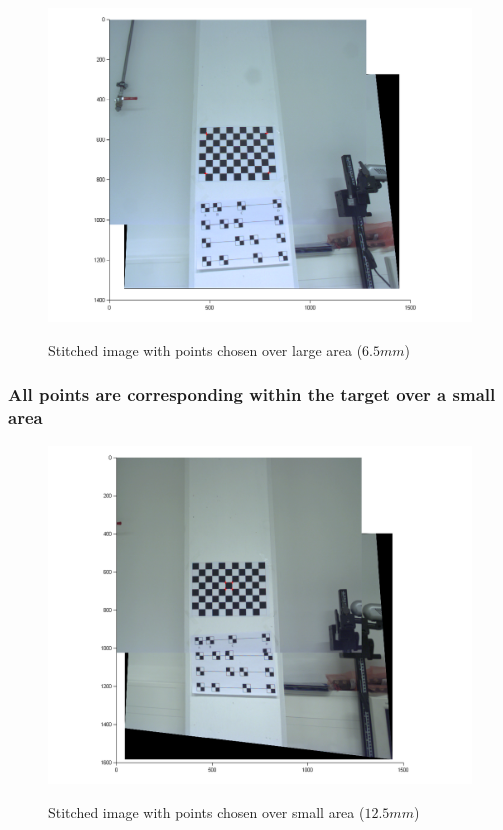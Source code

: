\documentclass[
a4paper,     %
12pt         %
]{scrartcl}  %
\begin{document}
\begin{figure}[ht!]
 \centering
 \includegraphics[scale=0.5]{./Bildg_Messtechnik_Lab/PanoramaStitching/figb1.png}
 \label{fig:largeareastitch6.5mm}
 \caption{Stitched image with points chosen over large area ($6.5mm$)}
\end{figure}

\subsubsection{All points are corresponding within the target over a small area}

\begin{figure}[ht!]
 \centering
 \includegraphics[scale=0.5]{./Bildg_Messtechnik_Lab/PanoramaStitching/fig2.png}
 \label{fig:smallareastitch12.5mm}
 \caption{Stitched image with points chosen over small area ($12.5mm$)}
\end{figure}
\end{document}
